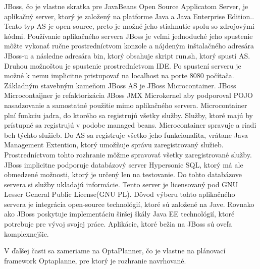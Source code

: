 JBoss, čo je vlastne skratka pre JavaBeans Open Source Applicatom Server, je aplikačný server, ktorý je založený na platforme Java a Java Enterprise Edition.\cite{jbossbook}. Tento typ AS je open-source, preto je možné jeho stiahnutie spolu so zdrojovými kódmi. Používanie aplikačného servera JBoss je veľmi jednoduché jeho spustenie môžte vykonať ručne prostredníctvom konzole a nájdeným inštalačného adresára JBoss-u a následne adresára bin, ktorý obsahuje skript run.sh, ktorý spustí AS. Druhou možnoštou je spustenie prostredníctvom IDE. Po spustení serveru je možné k nemu implicitne pristupovať na localhost na porte 8080 počítača. Základným stavebným kameňom JBoss AS je JBoss Microcontainer. JBoss Microcontaijner je refaktorizácia JBoss JMX Microkernel aby podporoval POJO nasadzovanie a samostatné použitie mimo aplikačného servera. Microcontainer plní funkciu jadra, do ktorého sa registrujú všetky služby. Služby, ktoré majú by prístupné sa registrujú v podobe managed beans. Microcontainer spravuje a riadi beh týchto služieb. Do AS sa registruje všetko jeho funkcionalita, vrátane Java Management Extention, ktorý umožňuje správu zaregistrovaný služieb. Prostredníctvom tohto rozhranie môžme spravovať všetky zaregistrované služby. JBoss implicitne podporuje databázový server Hypersonic SQL, ktorý má ale obmedzené možnosti, ktorý je určený len na testovanie. Do tohto databázove servera si služby ukladajú informácie.
Tento server je licensovaný pod GNU Lesser General Public License(GNU PL). Dôvod výberu tohto aplikačného servera je integrácia open-source technológií, ktoré sú založené na Jave. Rovnako ako JBoss poskytuje implementáciu širšej škály Java EE technológií, ktoré potrebuje pre vývoj svojej práce. Aplikácie, ktoré bežia na JBoss sú oveľa komplexnejšie.



V ďalšej časti sa zameriame na OptaPlanner, čo je vlastne na plánovací framework Optaplanne, pre ktorý je rozhranie navrhované.




